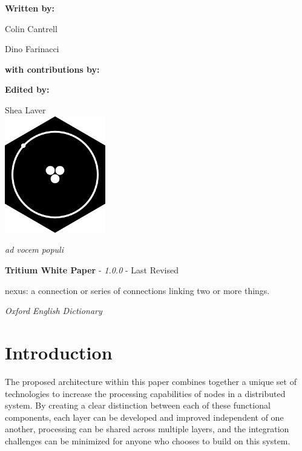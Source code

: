 \documentclass[11pt]{article}
\newcommand{\maketitlepage}[3]{
  \begingroup
  \centering
  
  \vspace*{2\baselineskip}
  
  \textbf{Written by:}\par
  \medskip
  Colin Cantrell\par
  Dino Farinacci\par

  \vspace*{2\baselineskip}

  \textbf{with contributions by:}\par\medskip
  \renewcommand\do[1]{%
    {
    \usevalue ##1:firstname \space \usevalue ##1:lastname \par}%
    }
  \docsvlist{#1}
  \vspace*{2\baselineskip}
  
  \textbf{Edited by:}\par
  \medskip
  Shea Laver
  \\
  \vspace*{3\baselineskip}
  \includegraphics[width=0.33\textwidth]{./rsz_tritium.png}
  \vspace*{1\baselineskip}
  
\begin{center}
\textit{ad vocem populi}
\end{center}  
  \pagebreak
  \endgroup
}
\begin{document}
\title{\rmfamily{}}

\date {\usvardate {}}
\maketitle
\begin{abstract}
\begin{center}
\bigskip
\noindent \textit{``Humanity is the solid foundation of all virtues"}
\end{center}

\begin{flushright}
Confucius
\end{flushright}
\bigskip

\noindent Blockchain is a flourishing technology that is in a constant state of change.
Nexus is pioneering a new approach to Blockchain technology that solves the biggest challenges faced by the industry, \textbf{\textit{viz.}} scalability, ease of integration, and intuitive user experience.
Beginning with the Tritium update, we are creating an innovative software stack containing multiple layers of abstraction that will streamline business integration into the Nexus framework, form the foundation of a cryptographic identity system, and make smart contracts easily accessible through a feature-rich API set.
Each API call will be developed through a standardization process, with input from businesses, industry leaders and developers, focused on providing a well-designed interface and seamless business integration.

\end{abstract}

\newpage

\tableofcontents
\newpage
\maketitlepage{Shea, Jules, Smith, April, Steve}
\newpage


\paragraph{\textbf{Tritium White Paper} - \textit{1.0.0} - Last Revised \date {}  }

\epigraph{nexus: a connection or series of connections linking two or more things.}{\textit{\footnotesize{Oxford English Dictionary}}}
\section{Introduction}

The proposed architecture within this paper combines together a unique set of technologies to increase the processing capabilities of nodes in a distributed system.
By creating a clear distinction between each of these functional components, each layer can be developed and improved independent of one another, processing can be shared across multiple layers, and the integration challenges can be minimized for anyone who chooses to build on this system.
\end{document}
